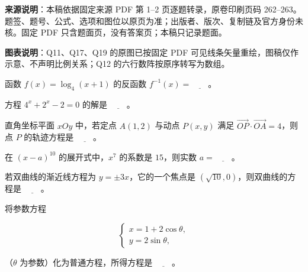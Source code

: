 


\begin{gktip}
\textbf{来源说明}：本稿依据固定来源 PDF 第 1–2 页逐题转录，原卷印刷页码 262–263。题签、题号、公式、选项和图位以原页为准；出版者、版次、复制链及官方身份未核。固定 PDF 只含题面页，没有答案页；本稿只记录题面。

\textbf{图表说明}：Q11、Q17、Q19 的原图已按固定 PDF 可见线条矢量重绘，图稿仅作示意、不声明比例关系；Q12 的六行数阵按原序转写为数组。
\end{gktip}


\begin{question}
函数 $f(x)=\log_4(x+1)$ 的反函数 $f^{-1}(x)=\underline{\qquad}$。

\end{question}
\begin{question}
方程 $4^x+2^x-2=0$ 的解是 $\underline{\qquad}$。

\end{question}
\begin{question}
直角坐标平面 $xOy$ 中，若定点 $A(1,2)$ 与动点 $P(x,y)$ 满足 $\overrightarrow{OP}\cdot\overrightarrow{OA}=4$，则点 $P$ 的轨迹方程是 $\underline{\qquad}$。

\end{question}
\begin{question}
在 $(x-a)^{10}$ 的展开式中，$x^7$ 的系数是 $15$，则实数 $a=\underline{\qquad}$。

\end{question}
\begin{question}
若双曲线的渐近线方程为 $y=\pm3x$，它的一个焦点是 $(\sqrt{10},0)$，则双曲线的方程是 $\underline{\qquad}$。

\end{question}
\begin{question}
将参数方程

\nopagebreak[4]
\[
\begin{cases}
x=1+2\cos\theta,\\
y=2\sin\theta,
\end{cases}
\]

（$\theta$ 为参数）化为普通方程，所得方程是 $\underline{\qquad}$。

\end{question}
